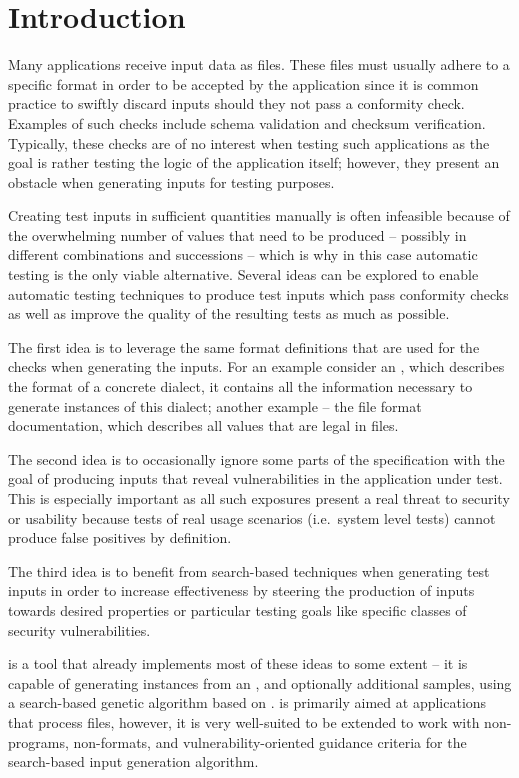 \section{Introduction}
Many applications receive input data as files. These files must usually adhere to a specific format in order
to be accepted by the application since it is common practice to swiftly discard inputs should they not pass a
conformity check. Examples of such checks include schema validation and checksum verification. Typically, these
checks are of no interest when testing such applications as the goal is rather testing the logic of the
application itself; however, they present an obstacle when generating inputs for
testing purposes.

Creating test inputs in sufficient quantities manually is often infeasible because of the overwhelming number
of values that need to be produced -- possibly in different combinations and successions -- which is why in
this case automatic testing is the only viable alternative. Several ideas can be explored to enable automatic
testing techniques to produce test inputs which pass conformity checks as well as improve the quality of the
resulting tests as much as possible.

The first idea is to leverage the same format definitions that are used for the checks when generating the
inputs. For an example consider an \xsd, which describes the format of a concrete \xml dialect, it contains all
the information necessary to generate instances of this dialect; another example -- the \png file format
documentation, which describes all values that are legal in \png files.

The second idea is to occasionally ignore some parts of the specification with the goal of producing inputs
that reveal vulnerabilities in the application under test. This is especially important as all such exposures
present a real threat to security or usability because tests of real usage scenarios (i.e.\ system level tests)
cannot produce false positives by definition.

The third idea is to benefit from search-based techniques when generating test inputs in order to increase
effectiveness by steering the production of inputs towards desired properties or particular testing goals like
specific classes of security vulnerabilities.

\xmlmate{}\cite{Havrikov:2014:XEX:2635868.2661666} is a tool that already implements most of these ideas to
some extent -- it is capable of generating \xml instances from an \xsd{}, and optionally additional \xml
samples, using a search-based genetic algorithm based on \evosuite{}\cite{fraser2013whole}. \xmlmate is
primarily aimed at \java applications that process \xml files, however, it is very well-suited to be extended
to work with non-\java programs, non-\xml formats, and vulnerability-oriented guidance criteria for the
search-based input generation algorithm.

